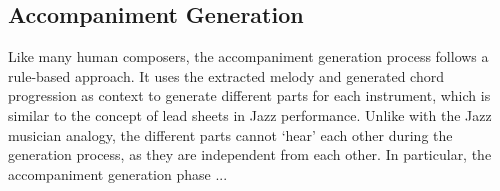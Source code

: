 \subsection{Accompaniment Generation}

Like many human composers, the accompaniment generation process follows a rule-based approach. It uses the extracted melody and generated chord progression as context to generate different parts for each instrument, which is similar to the concept of lead sheets in Jazz performance. Unlike with the Jazz musician analogy, the different parts cannot `hear' each other during the generation process, as they are independent from each other. In particular, the accompaniment generation phase ...
